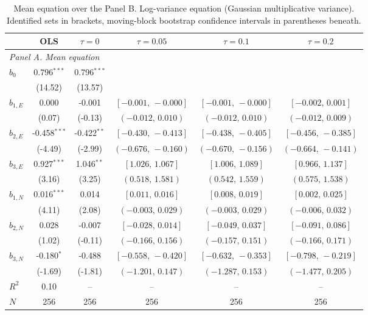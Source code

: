 \documentclass[11pt]{article}
\begin{document}
\begin{table}[!htbp]
\centering
\begin{threeparttable}
\caption{Mean equation over the Panel B. Log-variance equation (Gaussian multiplicative variance). Identified sets in brackets, moving-block bootstrap confidence intervals in parentheses beneath.}
\label{tab:log_var_eq_panel_harvey}
\scriptsize\setlength{\tabcolsep}{3pt}
\begin{tabular}{lccccc}
\toprule
 & OLS & $\tau{=}0$ & $\tau{=}0.05$ & $\tau{=}0.1$ & $\tau{=}0.2$ \\
\midrule
\multicolumn{6}{l}{\textit{Panel A. Mean equation}} \\
\midrule
$b_0$ & 0.796$^{***}$ & 0.796$^{***}$ &  &  &  \\
 & (14.52) & (13.57) &  &  &  \\
$b_{1,E}$ & 0.000 & -0.001 & $[-0.001,\,-0.000]$ & $[-0.001,\,-0.000]$ & $[-0.002,\,0.001]$ \\
 & (0.07) & (-0.13) & $(-0.012,\,0.010)$ & $(-0.012,\,0.010)$ & $(-0.012,\,0.009)$ \\
$b_{2,E}$ & -0.458$^{***}$ & -0.422$^{**}$ & $[-0.430,\,-0.413]$ & $[-0.438,\,-0.405]$ & $[-0.456,\,-0.385]$ \\
 & (-4.49) & (-2.99) & $(-0.676,\,-0.160)$ & $(-0.670,\,-0.156)$ & $(-0.664,\,-0.141)$ \\
$b_{3,E}$ & 0.927$^{***}$ & 1.046$^{**}$ & $[1.026,\,1.067]$ & $[1.006,\,1.089]$ & $[0.966,\,1.137]$ \\
 & (3.16) & (3.25) & $(0.518,\,1.581)$ & $(0.542,\,1.559)$ & $(0.575,\,1.538)$ \\
\midrule
$b_{1,N}$ & 0.016$^{***}$ & 0.014 & $[0.011,\,0.016]$ & $[0.008,\,0.019]$ & $[0.002,\,0.025]$ \\
 & (4.11) & (2.08) & $(-0.003,\,0.029)$ & $(-0.003,\,0.029)$ & $(-0.006,\,0.032)$ \\
$b_{2,N}$ & 0.028 & -0.007 & $[-0.028,\,0.014]$ & $[-0.049,\,0.037]$ & $[-0.091,\,0.086]$ \\
 & (1.02) & (-0.11) & $(-0.166,\,0.156)$ & $(-0.157,\,0.151)$ & $(-0.166,\,0.171)$ \\
$b_{3,N}$ & -0.180$^{*}$ & -0.488 & $[-0.558,\,-0.420]$ & $[-0.632,\,-0.353]$ & $[-0.798,\,-0.219]$ \\
 & (-1.69) & (-1.81) & $(-1.201,\,0.147)$ & $(-1.287,\,0.153)$ & $(-1.477,\,0.205)$ \\
\midrule
$R^2$ & 0.10 & -- & -- & -- & -- \\
$N$ & 256 & 256 & 256 & 256 & 256 \\

\end{tabular}
\end{threeparttable}
\end{table}
\end{document}
